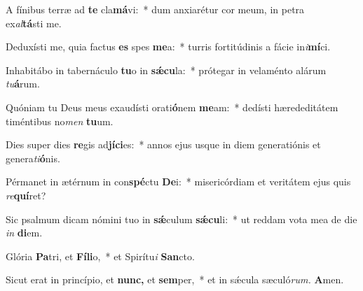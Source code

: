 \item A fínibus terræ ad \textbf{te} cla\textbf{má}vi:~* dum anxiarétur cor meum, in petra\\ ex\hspace{0.03em}\textit{al}\textbf{tá}sti me.
\item Deduxísti me, quia factus \textbf{es} spes \textbf{me}a:~* turris fortitúdinis a fácie in\textit{i}\textbf{mí}ci.
\item Inhabitábo in tabernáculo \textbf{tu}o in \textbf{sǽ}\textbf{cu}la:~* prótegar in velaménto alárum \textit{tu}\textbf{á}rum.
\item Quóniam tu Deus meus exaudísti orati\textbf{ó}nem \textbf{me}am:~* dedísti hærededitátem timéntibus no\textit{men} \textbf{tu}um.
\item Dies super dies \textbf{re}gis ad\textbf{jí}\textbf{ci}es:~* annos ejus usque in diem generatiónis et genera\hspace{0.03em}\textit{ti}\textbf{ó}nis.
\item Pérmanet in ætérnum in con\textbf{spé}ctu \textbf{De}i:~* misericórdiam et veritátem ejus quis \textit{re}\textbf{quí}ret?
\item Sic psalmum dicam nómini tuo in \textbf{sǽ}culum \textbf{sǽ}\textbf{cu}li:~* ut reddam vota mea de die \textit{in} \textbf{di}em.
\item Glória \textbf{Pa}tri, et \textbf{Fí}\textbf{li}o,~* et Spirítu\textit{i} \textbf{San}cto.
\item Sicut erat in princípio, et \textbf{nunc,} et \textbf{sem}per,~* et in sǽcula sæculó\textit{rum.} \textbf{A}men.
